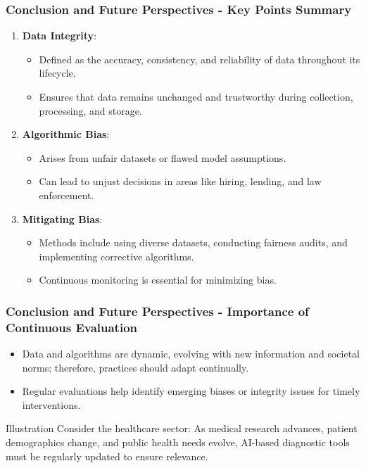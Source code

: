 \documentclass{beamer}
\begin{document}
\begin{frame}[fragile]
    \frametitle{Conclusion and Future Perspectives - Key Points Summary}

    \begin{enumerate}
        \item \textbf{Data Integrity}:
            \begin{itemize}
                \item Defined as the accuracy, consistency, and reliability of data throughout its lifecycle.
                \item Ensures that data remains unchanged and trustworthy during collection, processing, and storage.
            \end{itemize}
        \item \textbf{Algorithmic Bias}:
            \begin{itemize}
                \item Arises from unfair datasets or flawed model assumptions.
                \item Can lead to unjust decisions in areas like hiring, lending, and law enforcement.
            \end{itemize}
        \item \textbf{Mitigating Bias}:
            \begin{itemize}
                \item Methods include using diverse datasets, conducting fairness audits, and implementing corrective algorithms.
                \item Continuous monitoring is essential for minimizing bias.
            \end{itemize}
    \end{enumerate}
\end{frame}

\begin{frame}[fragile]
    \frametitle{Conclusion and Future Perspectives - Importance of Continuous Evaluation}

    \begin{itemize}
        \item Data and algorithms are dynamic, evolving with new information and societal norms; therefore, practices should adapt continually.
        \item Regular evaluations help identify emerging biases or integrity issues for timely interventions.
    \end{itemize}

    \begin{block}{Illustration}
        Consider the healthcare sector: As medical research advances, patient demographics change, and public health needs evolve, AI-based diagnostic tools must be regularly updated to ensure relevance.
    \end{block}
\end{frame}
\end{document}
